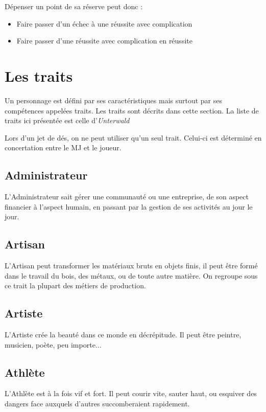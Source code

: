 \documentclass[10pt,twoside,twocolumn,openany,bg=print,justified]{dndbook}
\begin{document}
Dépenser un point de sa réserve peut donc :

\begin{itemize}
	\item Faire passer d'un échec à une réussite avec complication
	\item Faire passer d'une réussite avec complication en réussite
\end{itemize}
\newpage
\section{Les traits}

Un personnage est défini par ses caractéristiques mais surtout par ses compétences appelées traits. Les traits sont décrits dans cette section. La liste de traits ici présentée est celle d'\emph{Unterwald}

Lors d'un jet de dés, on ne peut utiliser qu'un seul trait. Celui-ci est déterminé en concertation entre le MJ et le joueur.

\subsection*{Administrateur}

L'Administrateur sait gérer une communauté ou une entreprise, de son aspect financier à l'aspect humain, en passant par la gestion de ses activités au jour le jour.

\subsection*{Artisan}

L'Artisan peut transformer les matériaux bruts en objets finis, il peut être formé dans le travail du bois, des métaux, ou de toute autre matière. On regroupe sous ce trait la plupart des métiers de production.

\subsection*{Artiste}

L'Artiste crée la beauté dans ce monde en décrépitude. Il peut être peintre, musicien, poète, peu importe...

\subsection*{Athlète}

L'Athlète est à la fois vif et fort. Il peut courir vite, sauter haut, ou esquiver des dangers face auxquels d'autres succomberaient rapidement.
\end{document}
